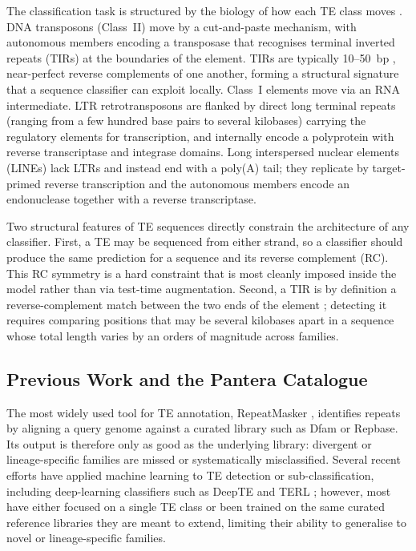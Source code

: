 \documentclass[12pt]{article}
\begin{document}
The classification task is structured by the biology of how each TE class moves \cite{wicker2007unified,wells2020field}. DNA transposons (Class~II) move by a cut-and-paste mechanism, with autonomous members encoding a transposase that recognises terminal inverted repeats (TIRs) at the boundaries of the element. TIRs are typically 10--50~bp \cite{wicker2007unified}, near-perfect reverse complements of one another, forming a structural signature that a sequence classifier can exploit locally. Class~I elements move via an RNA intermediate. LTR retrotransposons are flanked by direct long terminal repeats (ranging from a few hundred base pairs to several kilobases) \cite{wicker2007unified} carrying the regulatory elements for transcription, and internally encode a polyprotein with reverse transcriptase and integrase domains. Long interspersed nuclear elements (LINEs) lack LTRs and instead end with a poly(A) tail; they replicate by target-primed reverse transcription and the autonomous members encode an endonuclease together with a reverse transcriptase.

Two structural features of TE sequences directly constrain the architecture of any classifier. First, a TE may be sequenced from either strand, so a classifier should produce the same prediction for a sequence and its reverse complement (RC). This RC symmetry is a hard constraint that is most cleanly imposed inside the model rather than via test-time augmentation. Second, a TIR is by definition a reverse-complement match between the two ends of the element \cite{wicker2007unified}; detecting it requires comparing positions that may be several kilobases apart in a sequence whose total length varies by an orders of magnitude across families.

\subsection{Previous Work and the Pantera Catalogue}

The most widely used tool for TE annotation, RepeatMasker \cite{smit2015repeatmasker}, identifies repeats by aligning a query genome against a curated library such as Dfam \cite{storer2021dfam} or Repbase. Its output is therefore only as good as the underlying library: divergent or lineage-specific families are missed or systematically misclassified. Several recent efforts have applied machine learning to TE detection or sub-classification, including deep-learning classifiers such as DeepTE \cite{yan2020deepte} and TERL \cite{dacruz2021terl}; however, most have either focused on a single TE class or been trained on the same curated reference libraries they are meant to extend, limiting their ability to generalise to novel or lineage-specific families.
\end{document}
